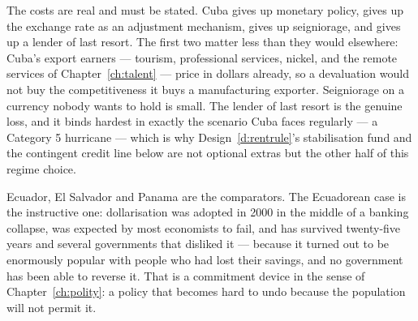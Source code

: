 The costs are real and must be stated. Cuba gives up monetary policy, gives up
the exchange rate as an adjustment mechanism, gives up seigniorage, and gives up
a lender of last resort. The first two matter less than they would elsewhere:
Cuba's export earners --- tourism, professional services, nickel, and the remote
services of Chapter~\ref{ch:talent} --- price in dollars already, so a
devaluation would not buy the competitiveness it buys a manufacturing exporter.
Seigniorage on a currency nobody wants to hold is small. The lender of last
resort is the genuine loss, and it binds hardest in exactly the scenario Cuba
faces regularly --- a Category 5 hurricane --- which is why
Design~\ref{d:rentrule}'s stabilisation fund and the contingent credit line
below are not optional extras but the other half of this regime choice.

Ecuador, El Salvador and Panama are the comparators. The Ecuadorean case is the
instructive one: dollarisation was adopted in 2000 in the middle of a banking
collapse, was expected by most economists to fail, and has survived twenty-five
years and several governments that disliked it --- because it turned out to be
enormously popular with people who had lost their savings, and no government has
been able to reverse it. That is a commitment device in the sense of
Chapter~\ref{ch:polity}: a policy that becomes hard to undo because the
population will not permit it.

